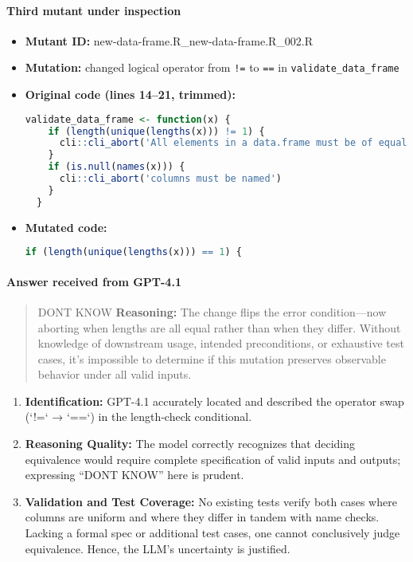 \paragraph{Third mutant under inspection}
\begin{itemize}
  \item \textbf{Mutant ID:} new-data-frame.R\_new-data-frame.R\_002.R  
  \item \textbf{Mutation:} changed logical operator from \texttt{!=} to \texttt{==} in \texttt{validate\_data\_frame}
  \item \textbf{Original code (lines 14–21, trimmed):}
  \begin{lstlisting}[language=R]
  validate_data_frame <- function(x) {
    if (length(unique(lengths(x))) != 1) {
      cli::cli_abort('All elements in a data.frame must be of equal length')
    }
    if (is.null(names(x))) {
      cli::cli_abort('columns must be named')
    }
  }
  \end{lstlisting}
  \item \textbf{Mutated code:}
  \begin{lstlisting}[language=R]
    if (length(unique(lengths(x))) == 1) {
  \end{lstlisting}
\end{itemize}

\paragraph{Answer received from GPT-4.1}
\begin{quote}
DONT KNOW  
\textbf{Reasoning:}  
The change flips the error condition—now aborting when lengths are all equal rather than when they differ. Without knowledge of downstream usage, intended preconditions, or exhaustive test cases, it’s impossible to determine if this mutation preserves observable behavior under all valid inputs.
\end{quote}

\begin{enumerate}
  \item \textbf{Identification:}  
    GPT-4.1 accurately located and described the operator swap (`!=` → `==`) in the length‐check conditional.
  
  \item \textbf{Reasoning Quality:}  
    The model correctly recognizes that deciding equivalence would require complete specification of valid inputs and outputs; expressing “DONT KNOW” here is prudent.
  
  \item \textbf{Validation and Test Coverage:}  
    No existing tests verify both cases where columns are uniform and where they differ in tandem with name checks. Lacking a formal spec or additional test cases, one cannot conclusively judge equivalence. Hence, the LLM’s uncertainty is justified.
\end{enumerate}

